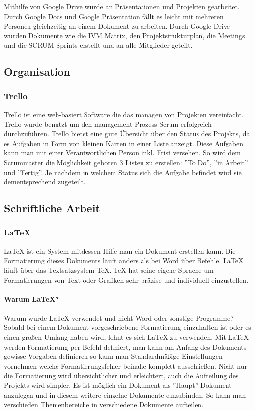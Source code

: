 Mithilfe von Google Drive wurde an Präsentationen und Projekten gearbeitet. Durch Google Docs und Google Präsentation fällt es leicht mit mehreren Personen gleichzeitig an einem Dokument zu arbeiten. Durch Google Drive wurden Dokumente wie die IVM Matrix, den Projektstrukturplan, die Meetings und die SCRUM Sprints erstellt und an alle Mitglieder geteilt. 
\subsection{Organisation}
\subsubsection {Trello}
Trello ist eine web-basiert Software die das managen von Projekten vereinfacht. Trello wurde benutzt um den management Prozess Scrum erfolgreich durchzuführen. Trello bietet eine gute Übersicht über den Status des Projekts, da es Aufgaben in Form von kleinen Karten in einer Liste anzeigt. Diese Aufgaben kann man mit einer Verantwortlichen Person inkl. Frist versehen. So wird dem Scrummaster die Möglichkeit geboten 3 Listen zu erstellen: ''To Do'', ''in Arbeit'' und ''Fertig''. Je nachdem in welchem Status sich die Aufgabe befindet wird sie dementsprechend zugeteilt.

\subsection{Schriftliche Arbeit}
\subsubsection {LaTeX}
LaTeX ist ein System mitdessen Hilfe man ein Dokument erstellen kann. Die Formatierung dieses Dokuments läuft anders als bei Word über Befehle. LaTeX läuft über das Textsatzsystem TeX. TeX hat seine eigene Sprache um Formatierungen von Text oder Grafiken sehr präzise und individuell einzustellen. 
\paragraph{Warum LaTeX?}
Warum wurde LaTeX verwendet und nicht Word oder sonstige Programme? Sobald bei einem Dokument vorgeschriebene Formatierung einzuhalten ist oder es einen großen Umfang haben wird, lohnt es sich LaTeX zu verwenden. Mit LaTeX werden Formatierung per Befehl definiert, man kann am Anfang des Dokuments gewisse Vorgaben definieren so kann man Standardmäßige Einstellungen vornehmen welche Formatierungsfehler beinahe komplett ausschließen. Nicht nur die Formatierung wird übersichtlicher und erleichtert, auch die Aufteilung des Projekts wird simpler. Es ist möglich ein Dokument als ''Haupt''-Dokument anzulegen und in diesem weitere einzelne Dokumente einzubinden. So kann man verschieden Themenbereiche in verschiedene Dokumente aufteilen. \cite{TechnologieLaTeX} %
\pagebreak